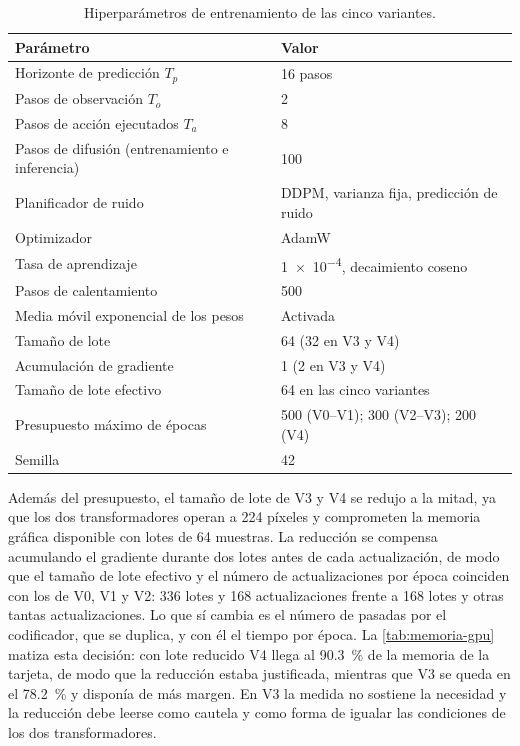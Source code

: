 \begin{table}[htbp]
  \centering
  \caption{Hiperpar\'ametros de entrenamiento de las cinco variantes.}
  \label{tab:hiperparametros}
  \small
  \begin{tabular}{ll}
    \toprule
    Par\'ametro & Valor \\
    \midrule
    Horizonte de predicci\'on $T_p$        & \num{16} pasos \\
    Pasos de observaci\'on $T_o$           & \num{2} \\
    Pasos de acci\'on ejecutados $T_a$     & \num{8} \\
    Pasos de difusi\'on (entrenamiento e inferencia) & \num{100} \\
    Planificador de ruido                  & DDPM, varianza fija, predicci\'on de ruido \\
    Optimizador                            & AdamW \cite{loshchilov2019adamw} \\
    Tasa de aprendizaje                    & \num{1e-4}, decaimiento coseno \\
    Pasos de calentamiento                 & \num{500} \\
    Media m\'ovil exponencial de los pesos & Activada \\
    Tama\~no de lote                       & \num{64} (\num{32} en V3 y V4) \\
    Acumulaci\'on de gradiente             & \num{1} (\num{2} en V3 y V4) \\
    Tama\~no de lote efectivo              & \num{64} en las cinco variantes \\
    Presupuesto m\'aximo de \'epocas       & \num{500} (V0--V1); \num{300} (V2--V3);
                                               \num{200} (V4) \\
    Semilla                                & \num{42} \\
    \bottomrule
  \end{tabular}
\end{table}

Adem\'as del presupuesto, el tama\~no de lote de V3 y V4 se redujo a la mitad, ya que los
dos transformadores operan a \num{224} p\'ixeles y comprometen la memoria gr\'afica
disponible con lotes de \num{64} muestras. La reducci\'on se compensa acumulando el
gradiente durante dos lotes antes de cada actualizaci\'on, de modo que el tama\~no de lote
efectivo y el n\'umero de actualizaciones por \'epoca coinciden con los de V0, V1 y V2:
\num{336} lotes y \num{168} actualizaciones frente a \num{168} lotes y otras tantas
actualizaciones. Lo que s\'i cambia es el n\'umero de pasadas por el codificador, que se
duplica, y con \'el el tiempo por \'epoca. La \cref{tab:memoria-gpu} matiza esta
decisi\'on: con lote reducido V4 llega al \SI{90.3}{\percent} de la memoria de la tarjeta,
de modo que la reducci\'on estaba justificada, mientras que V3 se queda en el
\SI{78.2}{\percent} y dispon\'ia de m\'as margen. En V3 la medida no sostiene la necesidad
y la reducci\'on debe leerse como cautela y como forma de igualar las condiciones de los
dos transformadores.

